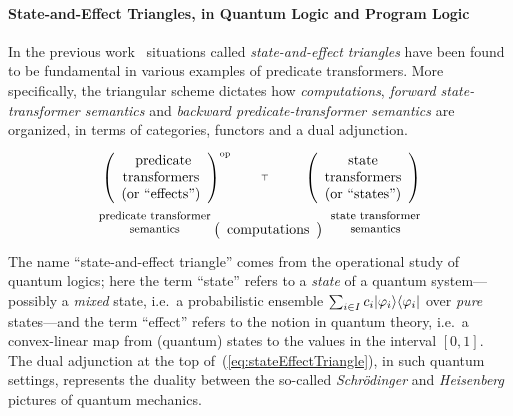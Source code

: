 \documentclass[9pt, preprint]{sigplanconf}
\theoremstyle{theorem}
\theoremstyle{definition}
\newcommand{\op}{\mathrm{op}}
\DeclarePairedDelimiter\bra{\langle}{\rvert}
\DeclarePairedDelimiter\ket{\lvert}{\rangle}
\begin{document}
\paragraph{State-and-Effect Triangles, in Quantum Logic and
   Program Logic}
In the previous work~\cite{Jacobs15LMCS,Jacobs15CALCO,Jacobs14CMCS} situations called
\emph{state-and-effect triangles} have been found to be fundamental in
various examples of predicate transformers. More specifically, the
triangular scheme
dictates
how
\emph{computations}, \emph{forward state-transformer semantics} and
\emph{backward predicate-transformer semantics} are organized, in terms of
 categories, functors and a dual adjunction.
\begin{equation}\label{eq:stateEffectTriangle}\small
 \vcenter{\xymatrix@R=.8em@C=-2em{
  {\normalsize\left(\begin{array}{c}
\text{ predicate}
     \\
		\text{transformers}
     \\
		\text{(or ``effects'')}
	 \end{array}\right)^{\op}}
     \ar@/^/[rr]\ar@/^/[rr];[]^{}
     \ar@{}[rr]|{\top}
 &&
  {\normalsize\left(\begin{array}{c}
\text{state}
     \\
		\text{transformers}
     \\
		\text{(or ``states'')}
	 \end{array}\right)}
 \\
 &
  {\normalsize\left(\begin{array}{c}
		      \text{computations}
	 \end{array}\right)
}
     \ar@/_/[ru]_(.6){\quad
  {\footnotesize\begin{array}{c}
   \text{state transformer}
    \\
   \text{semantics}
   \end{array}}
  }
     \ar@/^/[lu]^(.6){\footnotesize\begin{array}{c}
\text{predicate transformer}
    \\
   \text{semantics}
   \end{array}\quad}
}}
\end{equation}
The name ``state-and-effect triangle'' comes from the
operational study of quantum
logics; here the term
``state'' refers to a \emph{state} of a quantum system---possibly a
\emph{mixed}
state, i.e.\ a probabilistic ensemble $\sum_{i\in
       I}c_{i}\ket{\varphi_{i}}\bra{\varphi_{i}}$ over \emph{pure}
       states---and
 the term ``effect'' refers to the notion in quantum theory, i.e.\
 a convex-linear map from (quantum) states to the values in the interval
 $[0,1]$. The dual adjunction at the top
 of~(\ref{eq:stateEffectTriangle}), in such quantum settings,
 represents the duality between the
 so-called \emph{Schr\"{o}dinger} and \emph{Heisenberg} pictures of
 quantum mechanics.
\end{document}
